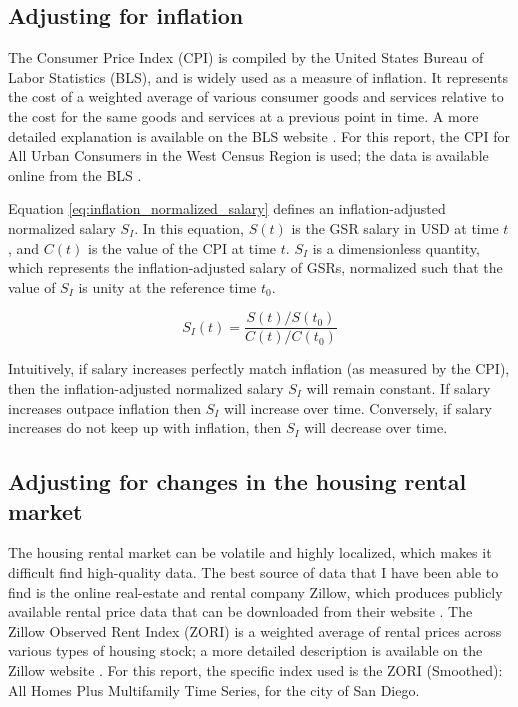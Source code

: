 \documentclass{article}
\begin{document}
\subsection{Adjusting for inflation}

The Consumer Price Index (CPI) is compiled by the United States Bureau of Labor Statistics (BLS), and is widely used as a measure of inflation. It represents the cost of a weighted average of various consumer goods and services relative to the cost for the same goods and services at a previous point in time. A more detailed explanation is available on the BLS website \citep{cpi_overview}. For this report, the CPI for All Urban Consumers in the West Census Region is used; the data is available online from the BLS \citep{cpi_data}.

Equation \ref{eq:inflation_normalized_salary} defines an inflation-adjusted normalized salary $S_I$. In this equation, $S(t)$ is the GSR salary in USD at time $t$, and $C(t)$ is the value of the CPI at time $t$. $S_I$ is a dimensionless quantity, which represents the inflation-adjusted salary of GSRs, normalized such that the value of $S_I$ is unity at the reference time $t_0$.

\begin{equation}
	S_I(t) = \frac{S(t)/S(t_0)}{C(t)/C(t_0)}
	\label{eq:inflation_normalized_salary}
\end{equation}

Intuitively, if salary increases perfectly match inflation (as measured by the CPI), then the inflation-adjusted normalized salary $S_I$ will remain constant. If salary increases outpace inflation then $S_I$ will increase over time. Conversely, if salary increases do not keep up with inflation, then $S_I$ will decrease over time.

\subsection{Adjusting for changes in the housing rental market}

The housing rental market can be volatile and highly localized, which makes it difficult find high-quality data. The best source of data that I have been able to find is the online real-estate and rental company Zillow, which produces publicly available rental price data that can be downloaded from their website \citep{zori_data}. The Zillow Observed Rent Index (ZORI) is a weighted average of rental prices across various types of housing stock; a more detailed description is available on the Zillow website \citep{zori_overview}. For this report, the specific index used is the ZORI (Smoothed): All Homes Plus Multifamily Time Series, for the city of San Diego.
\end{document}
